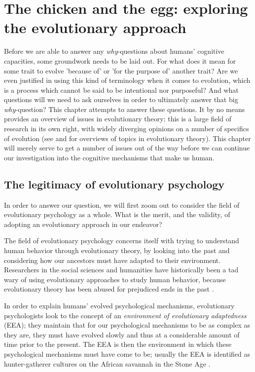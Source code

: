 \chapter{The chicken and the egg: exploring the evolutionary approach}


Before we are able to answer any \emph{why}-questions about humans' cognitive capacities, some groundwork needs to be laid out. For what does it mean for some trait to evolve 'because of' or 'for the purpose of' another trait? Are we even justified in using this kind of terminology when it comes to evolution, which is a process which cannot be said to be intentional nor purposeful? And what questions will we need to ask ourselves in order to ultimately answer that big  \emph{why}-question?
This chapter attempts to answer these questions. It by no means provides an overview of issues in evolutionary theory; this is a large field of research in its own right, with widely diverging opinions on a number of specifics of evolution (see \citet{Ariew02} and \citet{UllerLaland19} for overviews of topics in evolutionary theory).
This chapter will merely serve to get a number of issues out of the way before we can continue our investigation into the cognitive mechanisms that make us human.

\section{The legitimacy of evolutionary psychology}

In order to answer our question, we will first zoom out to consider the field of evolutionary psychology as a whole. What is the merit, and the validity, of adopting an evolutionary approach in our endeavor?

The field of evolutionary psychology concerns itself with trying to understand human behavior through evolutionary theory, by looking into the past and considering how our ancestors must have adapted to their environment.
Researchers in the social sciences and humanities have historically been a tad wary of using evolutionary approaches to study human behavior, because evolutionary theory has been abused for prejudiced ends in the past \citep[pp.~19--20]{LB02}.

In order to explain humans' evolved psychological mechanisms, evolutionary psychologists look to the concept of an \emph{environment of evolutionary adaptedness} (EEA); they maintain that for our psychological mechanisms to be as complex as they are, they must have evolved slowly and thus at a considerable amount of time prior to the present. The EEA is then the environment in which these psychological mechanisms must have come to be; usually the EEA is identified as hunter-gatherer cultures on the African savannah in the Stone Age \citep{LB02}.

